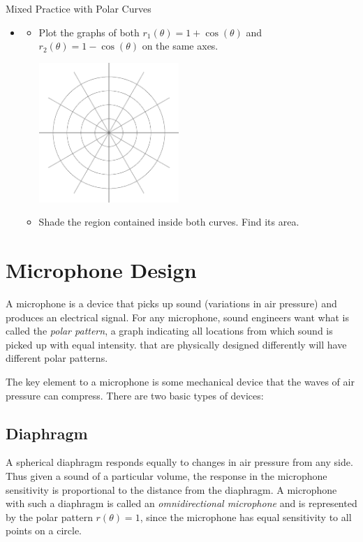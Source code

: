 \begin{exercise}{Mixed Practice with Polar Curves \Coffeecup \Coffeecup \Coffeecup}
\begin{itemize}
\item \begin{itemize}
\item  Plot the graphs of both $r_1(\theta)=1+\cos(\theta)$ and $r_2(\theta)=1-\cos(\theta)$ on the same axes.
	\begin{center}
		\includegraphics[width=150pt]{polar.eps}
	\end{center}
\item Shade the region contained inside both curves.  Find its area.
\vspace*{2in}
\end{itemize}
\end{itemize}

\end{exercise}

\section{Microphone Design}

A microphone is a device that picks up sound (variations in air pressure) and produces an electrical signal.  For any microphone, sound engineers want what is called the \emph{polar pattern}, a graph indicating all locations from which sound is picked up with equal intensity.   that are physically designed differently will have different polar patterns.

The key element to a microphone is some mechanical device that the waves of air pressure can compress.   There are two basic types of devices:

\subsection{Diaphragm}  A spherical diaphragm responds equally to changes in air pressure from any side.  Thus given a sound of a particular volume, the response in the microphone sensitivity is proportional to the distance from the diaphragm.  A microphone with such a diaphragm is called an \emph{omnidirectional microphone} and is represented by the polar pattern $r(\theta)= 1$, since the microphone has equal sensitivity to all points on a circle.  


